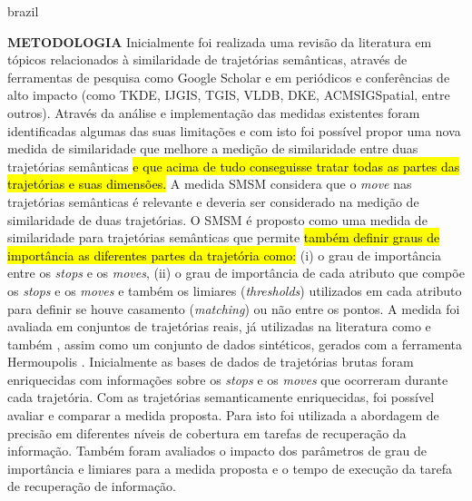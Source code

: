 {\begin{otherlanguage*}{brazil}
\begin{resumo}
        \textbf{METODOLOGIA}
        \newline
        \newline
        Inicialmente foi realizada uma revisão da literatura em tópicos relacionados à similaridade de trajetórias semânticas, através de ferramentas de pesquisa como Google Scholar e em periódicos e conferências de alto impacto (como TKDE, IJGIS, TGIS, VLDB, DKE, ACMSIGSpatial, entre outros). Através da análise e implementação das medidas existentes foram identificadas algumas das suas limitações e com isto foi possível propor uma nova medida de similaridade que melhore a medição de similaridade entre duas trajetórias semânticas \hl{e que acima de tudo conseguisse tratar todas as partes das trajetórias e suas dimensões.}
        \newline
        A medida SMSM considera que o \emph{move} nas trajetórias semânticas é relevante e deveria ser considerado na medição de similaridade de duas trajetórias. O SMSM é proposto como uma medida de similaridade para trajetórias semânticas que permite \hl{também definir graus de importância as diferentes partes da trajetória como:} (i) o grau de importância entre os \emph{stops} e os \emph{moves}, (ii) o grau de importância de cada atributo que compõe os \emph{stops} e os \emph{moves} e também os limiares (\emph{thresholds}) utilizados em cada atributo para definir se houve casamento (\emph{matching}) ou não entre os pontos.
        \newline
        A medida foi avaliada em conjuntos de trajetórias reais, já utilizadas na literatura como \cite{epfl-mobility-20090224} e também \cite{zheng2009mining}, assim como um conjunto de dados sintéticos, gerados com a ferramenta Hermoupolis \cite{Pelekis-Hermoupolis}. 
        Inicialmente as bases de dados de trajetórias brutas foram enriquecidas com informações sobre os \emph{stops} e os \emph{moves} que ocorreram durante cada trajetória. %
        Com as trajetórias semanticamente enriquecidas, foi possível avaliar e comparar a medida proposta. Para isto foi utilizada a abordagem de precisão em diferentes níveis de cobertura \cite{BaezaYatesRibeiroNeto2011} em tarefas de recuperação da informação. Também foram avaliados o impacto dos parâmetros de grau de importância e limiares para a medida proposta e o tempo de execução da tarefa de recuperação de informação.
        \newline
        \newline
        

\end{resumo}
\end{otherlanguage*}}
